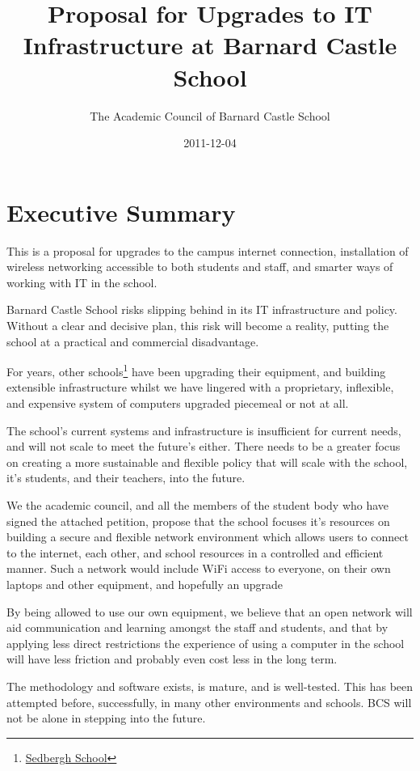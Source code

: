 \documentclass[a4paper,leqno,titlepage]{article}
\title{Proposal for Upgrades to IT Infrastructure at Barnard Castle School}
\author{The Academic Council of Barnard Castle School}
\date{2011-12-04}
\begin{document}
\maketitle

\section{Executive Summary}

This is a proposal for upgrades to the campus internet connection,
installation of wireless networking accessible to both students and staff,
and smarter ways of working with IT in the school. 

Barnard Castle School risks slipping behind in its
IT infrastructure and policy.
Without a clear and decisive plan, this risk will become a reality, putting
the school at a practical and commercial disadvantage.


For years, other schools\footnote{\href{http://www.sedberghschool.org/ict.html}{Sedbergh School}} 
have been upgrading their equipment, and building extensible infrastructure
whilst we have lingered with a proprietary, inflexible, and expensive system of
computers upgraded piecemeal or not at all.


The school's current systems and infrastructure is insufficient for current
needs, and will not scale to meet the future's either.
There needs to be a greater focus on creating a more sustainable and flexible
policy that will scale with the school, it's students, and their teachers, into
the future.


We the academic council, and all the members of the student body who have signed
the attached petition, propose that the school focuses it's resources on building
a secure and flexible network environment which allows users to connect to the
internet, each other, and school resources in a controlled and efficient manner.
Such a network would include WiFi access to everyone, on their own laptops and
other equipment, and hopefully an upgrade 


By being allowed to use our own equipment, we believe that an open network will
aid communication and learning amongst the staff and students, and that by
applying less direct restrictions the experience of using a computer in the
school will have less friction and probably even cost less in the long term.


The methodology and software exists, is mature, and is well-tested. This has been
attempted before, successfully, in many other environments and schools. BCS will
not be alone in stepping into the future.
\end{document}
